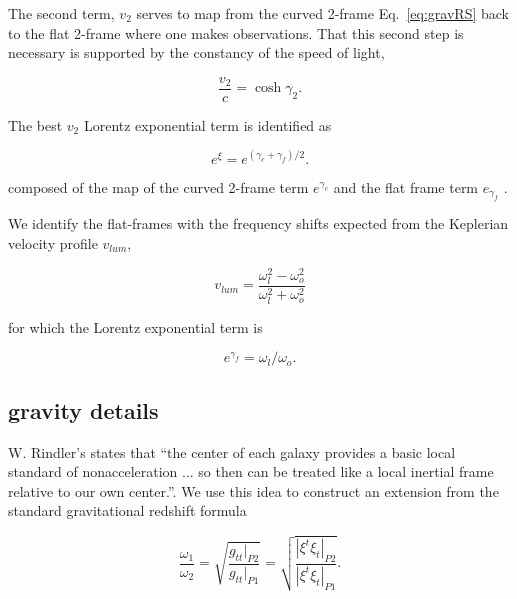 \documentclass[reprint,%
 amsmath,amssymb,
 aps,
]{revtex4-1}
\begin{document}
The  second term, $v_2$  serves to map from the curved 2-frame Eq.~\ref{eq:gravRS} back  to the flat 2-frame where one makes observations.  That this second step is necessary is supported by the constancy of the speed of light,

\begin{equation}
\frac{v_{2} }{c}=  \cosh \gamma_2.
\label{eq:hyperbolico}
\end{equation}

The best $v_2$   Lorentz exponential term  is identified as
 
\begin{equation}
    e^{\xi}=   e^{(\gamma_c+\gamma_f)/2}.
\end{equation}

composed of the map of the curved 2-frame term $e^{\gamma_c}$ and the flat frame term $e_{\gamma_f}$ . 

 
 We identify the flat-frames with the frequency shifts expected from the Keplerian velocity profile $v_{lum}$, 

 \begin{equation}
     v_{lum} = \frac{\omega_l^2 - \omega_o^2}{\omega_l^2 + \omega_o^2}
 \end{equation}
 
for which  the Lorentz exponential term is 

\begin{equation}
    e^{\gamma_f}=\omega_{l}/\omega_o.  
    \label{eq:flat}
\end{equation} 
  
 

  
  
\subsection{gravity details \label{sec:gravDets}}


    W. Rindler's states  that ``the center of each galaxy provides a basic local standard of nonacceleration ... so then can be treated like a local inertial frame relative to our own center.''\cite{rindler2013essential}. We  use this idea to construct an extension from the standard gravitational redshift formula 
   
   \begin{equation}
       \frac{\omega_1}{\omega_2}  =\sqrt{\frac{g_{tt}|_{P2}}{g_{tt}|_{P1}}} =\sqrt{\frac{|\xi^t\xi_{t}|_{P2}}{|\xi^t\xi_{t}|_{P1}}}. 
      \label{eq:grav}
    \end{equation}
    
\end{document}
